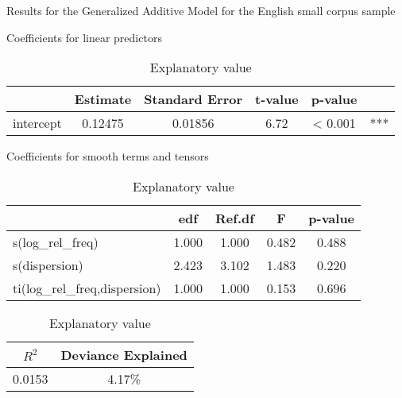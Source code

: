 \begin{table}[h!]

  \caption{Results for the Generalized Additive Model for the English small corpus sample}
  \label{tab:GAM-Eng-small}

  \begin{subtable}[h]{\textwidth}
    \centering
    \caption{Coefficients for linear predictors}
    \begin{tabular}{ l c c c c c }
      {       } & Estimate & Standard Error & t-value & p-value & { }\\
      \midrule
      intercept & 0.12475  & 0.01856        & 6.72    & < 0.001 & ***\\
    \end{tabular}
  \end{subtable}

  \vspace{1em}

  \begin{subtable}[h]{\textwidth}
    \centering
    \caption{Coefficients for smooth terms and tensors}
    \begin{tabular}{ l c c c c }
      { }                           & edf   & Ref.df & F     & p-value\\
      \midrule
      s(log\_rel\_freq)             & 1.000 & 1.000  & 0.482 & 0.488\\
      s(dispersion)                 & 2.423 & 3.102  & 1.483 & 0.220\\
      ti(log\_rel\_freq,dispersion) & 1.000 & 1.000  & 0.153 & 0.696\\
    \end{tabular}
  \end{subtable}

  \vspace{1em}

  \begin{subtable}[h]{\textwidth}
    \centering
    \caption{Explanatory value}
    \begin{tabular}{ c c }
      $R^2$  & Deviance Explained\\
      \midrule
      0.0153 & 4.17\%\\
    \end{tabular}
  \end{subtable}

\end{table}

